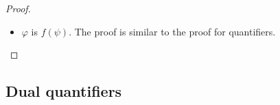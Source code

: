 \documentclass[preprint,3p,times]{elsarticle}
\def\sem#1{[\![ #1 ] \!]}
\newcommand{\bigset}[1]{\big\{#1\big\}}                     %
\begin{document}
\begin{proof}
\begin{itemize}
        \medskip
        ($\Leftarrow$) Suppose that $J = \bigset{i \in I \mid \delta_I \preceq |p_{I,i}|^*_\sigma(\sem{\cM_i}(\tau.\cQ f(\varphi_1,\ldots,\varphi_n)))} \in F$. By the projection condition, for every $k$, $1 \leq i \leq k$, for the family $\big(|p_{I,i}|^*_\sigma(\sem{\cM_i}(\sigma.\varphi_k))\big)_{j \in J}$, there exists $\delta^k_J \in Prop_\cC(|\prod_J \cM_j|(\sigma))$ such that $\downarrow\!\delta^k_J = \bigcap_{j \in J} \downarrow\!|p_{J,j}|^*_\sigma(\sem{\cM_j}(\sigma.\varphi_k))$, and then $\delta^k_J \preceq |p_{J,j}|^*_\sigma(\sem{\cM_j}(\sigma.\varphi_k))$, from which we have that $|p_{I,J}|^*_\sigma(\delta^k_J) \preceq |p_{I,j}|^*_\sigma(\sem{\cM_j}(\sigma.\varphi_k))$. As $\cQ f$ is filterable, there exists a generator \(\delta^k_I\) for every $k$, $1 \leq k \leq n$, such that $\delta^k_I \preceq |p_{I,J}|^*_\sigma(\delta^k_J)$ and $\delta_I = \cQ f_{\prod_I \cM_i}(\delta^1_I,\ldots,\delta^n_I)$. By the induction hypothesis, we have for every $k$, $1 \leq k \leq n$, that $\delta^k_I \preceq |\mu_I|^*_\sigma(\sem{\prod_F \cM}(\sigma.\varphi_k))$. As quantifiers are distributing over $\mu_I$, we can conclude that $\delta_I \preceq |\mu_I|^*(\sem{\prod_F \cM}(\tau.\cQ f(\varphi_1,\ldots,\varphi_n)))$.

        \item $\varphi$ is $f(\psi)$. The proof is similar to the proof for quantifiers.
    \end{itemize} 

\end{proof}

    
    

    
    

    
    

 
 
 
 
    

	
	

\subsection{Dual quantifiers}
\label{subsec:los:duality}
\end{document}
